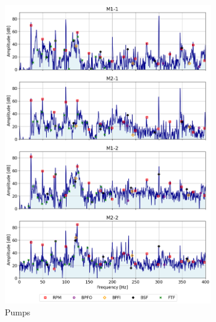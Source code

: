 \begin{figure}[h]
\begin{subfigure}[b]{0.24\textwidth}
        \includegraphics[width=\textwidth]{assets/results/defects/motors-dB.png}
        \caption{Pumps}
    \end{subfigure}
    \begin{subfigure}[b]{0.24\textwidth}

\end{subfigure}
\end{figure}
